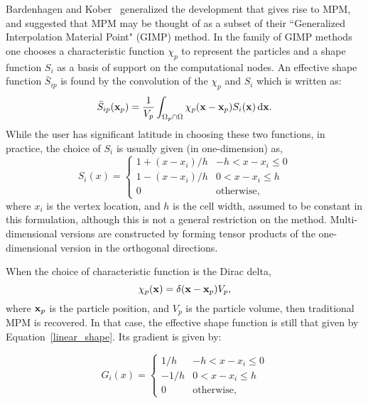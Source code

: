 Bardenhagen and Kober~\cite{bardgimp} generalized the
development that gives rise to MPM, and suggested that MPM
may be thought of as a subset of their ``Generalized Interpolation
Material Point" (GIMP) method.  In the family of GIMP methods
one chooses a characteristic function $\chi_p$ to represent
the particles and a shape function $S_i$ as a basis of support on the
computational nodes.  An effective shape function $\bar{S}_{ip}$  is found
by the convolution of the $\chi_p$ and $S_i$ which is written as:
\begin{equation}
\bar{S}_{ip}({\bf x}_p) = \frac{1}{V_p}  \int_{\Omega_p \cap \Omega} \chi_p({\bf x} - {\bf x}_p) S_i({\bf x})\,\mathrm{d}{\bf x} .
\label{effectiveS}
\end{equation}
While the user has significant latitude in choosing
these two functions, in practice, the choice of $S_i$ is usually given
(in one-dimension) as,
\begin{equation}
S_i\left(x\right) = \begin{cases} 1 + {\left(x-x_i\right) / h} & {-h < x-x_i \le 0} \\
                    1 - {\left(x-x_i\right) / h} & {0  < x-x_i \le h} \\
                    0 & \text{otherwise},
       \end{cases}
\label{linear_shape}
\end{equation}
where $x_i$ is the vertex location, and $h$ is the cell width, 
assumed to be constant in this formulation, 
although this is not a general restriction on the method.
Multi-dimensional versions are constructed by forming tensor products of the
one-dimensional version in the orthogonal directions.  

When the choice of characteristic function is the Dirac delta,
\begin{equation}
\chi_p({\bf x}) = \delta({\bf x}-{\bf x}_p)V_p , \label{MPM_char}
\end{equation}
where ${\bf x}_p$ is the particle position, and $V_p$ is the particle volume,
then traditional MPM is recovered.  In that case, the effective shape function
is still that given by Equation~\ref{linear_shape}.  Its gradient is given by:

\begin{equation}
G_i\left(x\right) = \begin{cases} {1 / h} & {-h < x-x_i \le 0} \\
                    {-1 / h} & {0  < x-x_i \le h} \\
                    0 & \text{otherwise},
       \end{cases}
\label{linear_shape_grad}
\end{equation}

